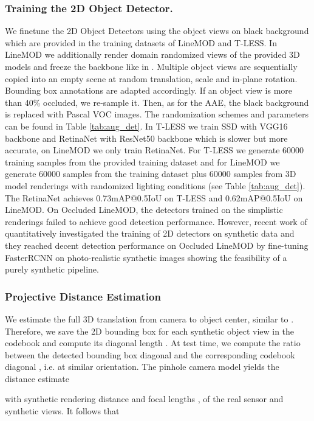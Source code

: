 \subsubsection{Training the 2D Object Detector.} We finetune the 2D Object Detectors using the object views on black background  which are provided in the training datasets of LineMOD and T-LESS. In LineMOD we additionally render domain randomized views of the provided 3D models and freeze the backbone like in \cite{hinterstoisser2017pre}. Multiple object views are sequentially copied into an empty scene at random translation, scale and in-plane rotation. Bounding box annotations are adapted accordingly. If an object view is more than 40\% occluded, we re-sample it. Then, as for the \gls{AAE}, the black background is replaced with Pascal VOC images. The randomization schemes and parameters can be found in Table \ref{tab:aug_det}. In T-LESS we train SSD \citep{liu2016ssd} with VGG16 backbone and RetinaNet \citep{lin2018focal} with ResNet50 backbone which is slower but more accurate, on LineMOD we only train RetinaNet. For T-LESS we generate 60000 training samples from the provided training dataset and for LineMOD we generate 60000 samples from the training dataset plus 60000 samples from 3D model renderings with randomized lighting conditions (see Table \ref{tab:aug_det}). The RetinaNet achieves 0.73mAP@0.5IoU on T-LESS and 0.62mAP@0.5IoU on LineMOD. On Occluded LineMOD, the detectors trained on the simplistic renderings failed to achieve good detection performance. However, recent work of  \cite{Hodan2019PhotorealisticIS} quantitatively investigated the training of 2D detectors on synthetic data and they reached decent detection performance on Occluded LineMOD by fine-tuning FasterRCNN on photo-realistic synthetic images showing the feasibility of a purely synthetic pipeline.

\subsubsection{Projective Distance Estimation}
\label{sec:proj}
We estimate the full 3D translation  from camera to object center, similar to \cite{kehl2017ssd}. Therefore, we save the 2D bounding box for each synthetic object view in the codebook and compute its diagonal length . At test time, we compute the ratio between the detected bounding box diagonal  and the corresponding codebook diagonal , i.e. at similar orientation. The pinhole camera model yields the distance estimate 
 
with synthetic rendering distance  and focal lengths ,  of the real sensor and synthetic views. It follows that

